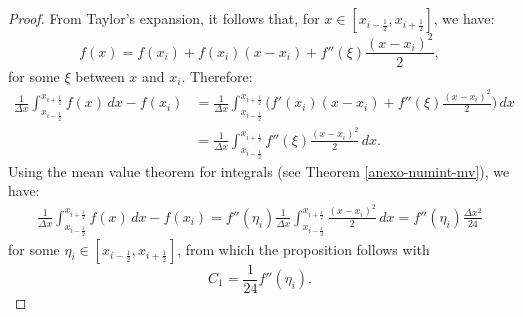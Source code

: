 \begin{proof}
	From Taylor's expansion, it follows that, for $x \in [x_{i-\frac{1}{2}},x_{i+\frac{1}{2}}]$, we have:
	\begin{equation}
		f(x) = f(x_i) +  f(x_i)(x-x_i) + f''(\xi)\frac{(x-x_i)^2}{2},
	\end{equation}
	for some $\xi$ between $x$ and $x_i$. Therefore:
	\begin{align*}
		\frac{1}{\Delta x} \int_{x_{i-\frac{1}{2}}}^{x_{i+\frac{1}{2}}} {f(x)\,dx} - f(x_i)  
		&= \frac{1}{\Delta x} \int_{x_{i-\frac{1}{2}}}^{x_{i+\frac{1}{2}}} 
		\bigg( f'(x_i)(x-x_i) + f''(\xi)\frac{(x-x_i)^2}{2} \bigg) \,dx \\ 
		&=  \frac{1}{\Delta x} \int_{x_{i-\frac{1}{2}}}^{x_{i+\frac{1}{2}}} 
		f''(\xi)\frac{(x-x_i)^2}{2}  \,dx.
	\end{align*}
	Using the mean value theorem for integrals (see Theorem \ref{anexo-numint-mv}), we have:
	\begin{align*}
		\frac{1}{\Delta x} \int_{x_{i-\frac{1}{2}}}^{x_{i+\frac{1}{2}}} {f(x)\,dx} - f(x_i)  = 
		f''(\eta_i) \frac{1}{\Delta x} \int_{x_{i-\frac{1}{2}}}^{x_{i+\frac{1}{2}}} 
		\frac{(x-x_i)^2}{2}  \,dx = f''(\eta_i)\frac{\Delta x^2}{24}
	\end{align*}	
	for some $\eta_i \in [x_{i-\frac{1}{2}},x_{i+\frac{1}{2}}]$, from which the proposition follows with
	\begin{equation}
		C_1 = \frac{1}{24}f''(\eta_i).
	\end{equation}
\end{proof}

